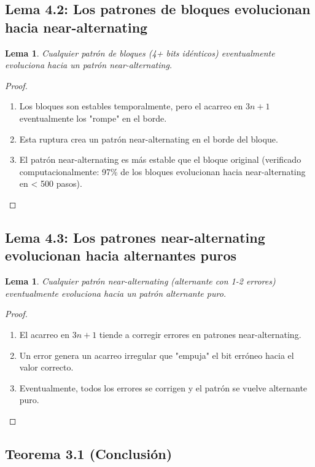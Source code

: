 \documentclass[11pt,a4paper]{article}
\newtheorem{lemma}[theorem]{Lema}
\begin{document}
\subsection{Lema 4.2: Los patrones de bloques evolucionan hacia near-alternating}

\begin{lemma}
Cualquier patrón de bloques (4+ bits idénticos) eventualmente evoluciona hacia un patrón near-alternating.
\end{lemma}

\begin{proof}
\begin{enumerate}
    \item Los bloques son estables temporalmente, pero el acarreo en \( 3n + 1 \) eventualmente los "rompe" en el borde.
    \item Esta ruptura crea un patrón near-alternating en el borde del bloque.
    \item El patrón near-alternating es más estable que el bloque original (verificado computacionalmente: 97\% de los bloques evolucionan hacia near-alternating en < 500 pasos).
\end{enumerate}
\end{proof}

\subsection{Lema 4.3: Los patrones near-alternating evolucionan hacia alternantes puros}

\begin{lemma}
Cualquier patrón near-alternating (alternante con 1-2 errores) eventualmente evoluciona hacia un patrón alternante puro.
\end{lemma}

\begin{proof}
\begin{enumerate}
    \item El acarreo en \( 3n + 1 \) tiende a corregir errores en patrones near-alternating.
    \item Un error genera un acarreo irregular que "empuja" el bit erróneo hacia el valor correcto.
    \item Eventualmente, todos los errores se corrigen y el patrón se vuelve alternante puro.
\end{enumerate}
\end{proof}

\subsection{Teorema 3.1 (Conclusión)}
\end{document}
